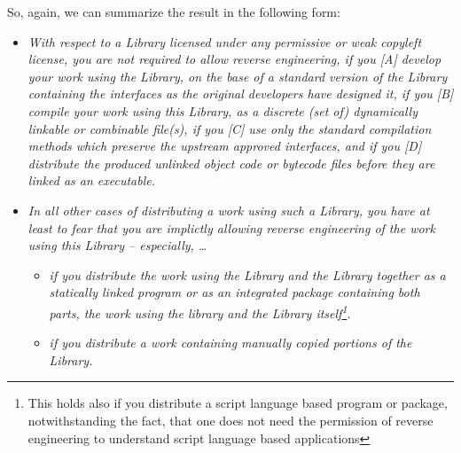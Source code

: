 So, again, we can summarize the result in the following form:

\begin{itemize}
  \item \emph{With respect to a Library licensed under any permissive or weak
  copyleft license, you are not required to allow reverse engineering, if you
  [A] develop your work using the Library, on the base of a standard version of
  the Library containing the interfaces as the original developers have designed it,
  if you [B] compile your work using this Library, as a discrete (set of)
  dynamically linkable or combinable file(s), if you [C] use only the standard
  compilation methods which preserve the upstream approved interfaces, and if
  you [D] distribute the produced unlinked object code or bytecode files before
  they are linked as an executable.}
  \item \emph{In all other cases of distributing a work using such a Library,
  you have at least to fear that you are implictly allowing reverse engineering
  of the work using this Library -- especially, \ldots}
  \begin{itemize}
    \item \emph{if you distribute the work using the Library and the Library
    together as a statically linked program or as an integrated package
    containing both parts, the work using the library and the Library
    itself\footnote{This holds also if you distribute a script language based
    program or package, notwithstanding the fact, that one does not need the
    permission of reverse engineering to understand script language based
    applications}.}
    \item \emph{if you distribute a work containing manually copied portions of
    the Library.}
  \end{itemize}
\end{itemize}



